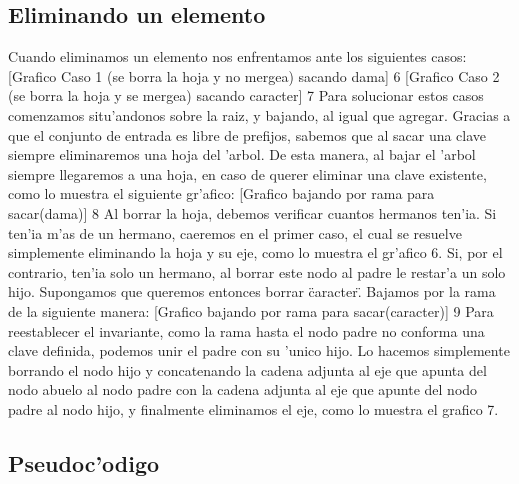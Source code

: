 \subsection{Eliminando un elemento}
Cuando eliminamos un elemento nos enfrentamos ante los siguientes casos:
[Grafico Caso 1 (se borra la hoja y no mergea) sacando dama] 6
[Grafico Caso 2 (se borra la hoja y se mergea) sacando caracter] 7
Para solucionar estos casos comenzamos situ'andonos sobre la raiz, y bajando, al igual que agregar. Gracias a que el conjunto de entrada es libre de prefijos, sabemos que al sacar una clave siempre eliminaremos una hoja del 'arbol. De esta manera, al bajar el 'arbol siempre llegaremos a una hoja, en caso de querer eliminar una clave existente, como lo muestra el siguiente gr'afico:
[Grafico bajando por rama para sacar(dama)] 8
Al borrar la hoja, debemos verificar cuantos hermanos ten'ia. Si ten'ia m'as de un hermano, caeremos en el primer caso, el cual se resuelve simplemente eliminando la hoja y su eje, como lo muestra el gr'afico 6. Si, por el contrario, ten'ia solo un hermano, al borrar este nodo al padre le restar'a un solo hijo. Supongamos que queremos entonces borrar \"caracter\". Bajamos por la rama de la siguiente manera:
[Grafico bajando por rama para sacar(caracter)] 9
Para reestablecer el invariante, como la rama hasta el nodo padre no conforma una clave definida, podemos unir el padre con su 'unico hijo. Lo hacemos simplemente borrando el nodo hijo y concatenando la cadena adjunta al eje que apunta del nodo abuelo al nodo padre con la cadena adjunta al eje que apunte del nodo padre al nodo hijo, y finalmente eliminamos el eje, como lo muestra el grafico 7.

\subsection{Pseudoc'odigo}

